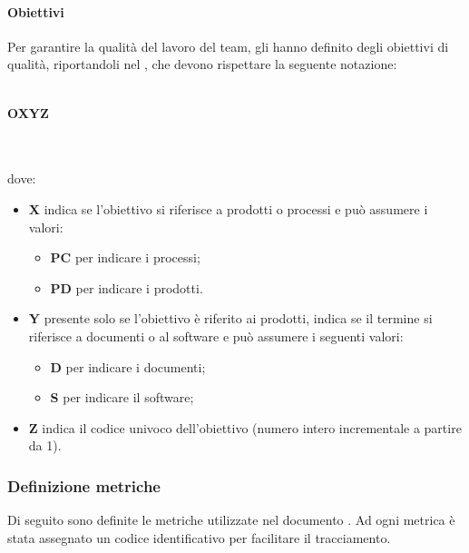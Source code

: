 \paragraph{Obiettivi}
Per garantire la qualità del lavoro del team, gli \AMMP{} hanno definito degli obiettivi di qualità,
riportandoli nel \PQdoc, che devono rispettare la seguente notazione:\\ \\
\centerline{\textbf{O\textbraceleft{}X\textbraceright{}\textbraceleft{}Y\textbraceright{}\textbraceleft{}Z\textbraceright{}}} \\ \\
dove:
\begin{itemize}
	\item \textbf{X} indica se l'obiettivo si riferisce a prodotti o processi e può assumere i valori:
	\begin{itemize}
		\item \textbf{PC} per indicare i processi;
		\item \textbf{PD} per indicare i prodotti.
	\end{itemize}
	\item \textbf{Y} presente solo se l'obiettivo è riferito ai prodotti, indica se il termine  si riferisce a documenti o al software e può assumere i seguenti valori:
	\begin{itemize}
		\item \textbf{D} per indicare i documenti;
		\item \textbf{S} per indicare il software;
	\end{itemize}
	\item \textbf{Z} indica il codice univoco dell'obiettivo (numero intero incrementale a partire da 1).
\end{itemize}
\subsubsection{Definizione metriche}
Di seguito sono definite le metriche utilizzate nel documento \PQdocRP{}. Ad ogni metrica è stata assegnato un codice identificativo per facilitare il tracciamento.
